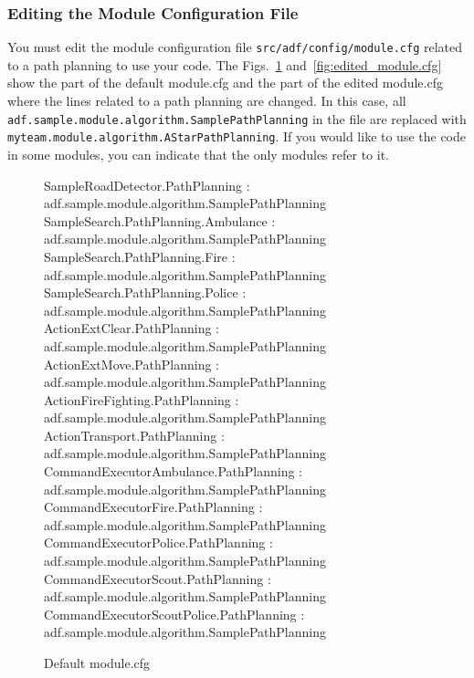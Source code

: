 \documentclass[a4paper]{article}
\begin{document}
\subsubsection{Editing the Module Configuration File}
\label{subsubsec:module.cfg}
You must edit the module configuration file \texttt{src/adf/config/module.cfg} related to a path planning to use your code. The Figs.~\ref{fig:default_module.cfg} and~\ref{fig:edited_module.cfg} show the part of the default module.cfg and the part of the edited module.cfg where the lines related to a path planning are changed. In this case, all \texttt{adf.sample.module.algorithm.SamplePathPlanning} in the file are replaced with \texttt{myteam.module.algorithm.AStarPathPlanning}. If you would like to use the code in some modules, you can indicate that the only modules refer to it.
\begin{figure}[h]
 \begin{center}
  \begin{screen}
   {\ttfamily
SampleRoadDetector.PathPlanning : adf.sample.module.algorithm.SamplePathPlanning\\
SampleSearch.PathPlanning.Ambulance : adf.sample.module.algorithm.SamplePathPlanning\\
SampleSearch.PathPlanning.Fire : adf.sample.module.algorithm.SamplePathPlanning\\
SampleSearch.PathPlanning.Police : adf.sample.module.algorithm.SamplePathPlanning\\
ActionExtClear.PathPlanning : adf.sample.module.algorithm.SamplePathPlanning\\
ActionExtMove.PathPlanning : adf.sample.module.algorithm.SamplePathPlanning\\
ActionFireFighting.PathPlanning : adf.sample.module.algorithm.SamplePathPlanning\\
ActionTransport.PathPlanning : adf.sample.module.algorithm.SamplePathPlanning\\
CommandExecutorAmbulance.PathPlanning : adf.sample.module.algorithm.SamplePathPlanning\\
CommandExecutorFire.PathPlanning : adf.sample.module.algorithm.SamplePathPlanning\\
CommandExecutorPolice.PathPlanning : adf.sample.module.algorithm.SamplePathPlanning\\
CommandExecutorScout.PathPlanning : adf.sample.module.algorithm.SamplePathPlanning\\
CommandExecutorScoutPolice.PathPlanning : adf.sample.module.algorithm.SamplePathPlanning
}
  \end{screen}
  \caption{Default module.cfg}
  \label{fig:default_module.cfg}
 \end{center}
\end{figure}
\end{document}
